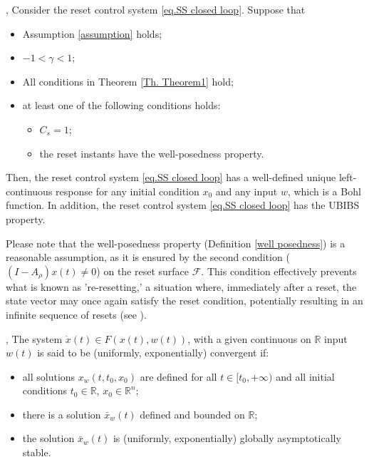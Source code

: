 \begin{lemma}
    \label{lemma UBIBS}
    \cite[Lemma 2]{dastjerdi2023frequency}, Consider the reset control system \eqref{eq.SS closed loop}. Suppose that
    \begin{itemize}
        \item Assumption \ref{assumption} holds;
        \item $-1<\gamma<1$;
    \item All conditions in Theorem \ref{Th. Theorem1} hold;
        \item at least one of the following conditions holds:
        \begin{itemize}
            \item $C_s=1$;
            \item the reset instants have the well-posedness property.
        \end{itemize}
    \end{itemize}
    Then, the reset control system \eqref{eq.SS closed loop} has a well-defined unique left-continuous response for any initial condition $x_0$ and any input $w$, which is a Bohl function. In addition, the reset control system \eqref{eq.SS closed loop} has the UBIBS property.\\
\end{lemma}

Please note that the well-posedness property (Definition \ref{well posedness}) is a reasonable assumption, as it is ensured by the second condition ($(I-A_\rho)x(t) \neq 0$) on the reset surface $\mathcal{F}$. This condition effectively prevents what is known as 're-resetting,' a situation where, immediately after a reset, the state vector may once again satisfy the reset condition, potentially resulting in an infinite sequence of resets (see \cite[Sections 1.41 and 2.2.1]{banos2012reset}).\\

\begin{definition}
    \label{def: convergence}
    \cite[Definition 2]{pavlov2007frequency}, The system $\dot{x}(t) \in F(x(t),w(t))$, with a given continuous on $\mathbb{R}$ input $w(t)$ is said to be (uniformly, exponentially) convergent if:
    \begin{itemize}
        \item all solutions $x_w(t,t_0,x_0)$ are defined for all $t \in [t_0,+\infty)$ and all initial conditions $t_0 \in \mathbb{R}$, $x_0\in\mathbb{R}^n$;
        \item there is a solution $\bar{x}_w(t)$ defined and bounded on $\mathbb{R}$;
        \item the solution $\bar{x}_w(t)$ is (uniformly, exponentially) globally asymptotically stable. \\
    \end{itemize}
\end{definition}

